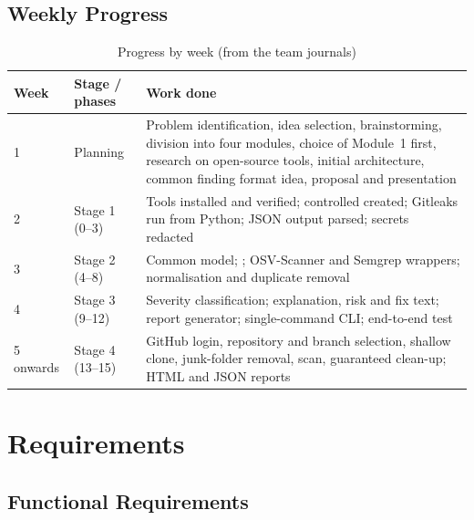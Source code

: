 \documentclass[12pt,a4paper]{article}
\newcommand{\code}[1]{\texttt{\detokenize{#1}}}
\begin{document}
\subsection{Weekly Progress}

\begin{table}[H]
\centering
\caption{Progress by week (from the team journals)}
\label{tab:weekly}
\begin{tabularx}{\textwidth}{@{}p{1.6cm}p{3.2cm}X@{}}
\toprule
\textbf{Week} & \textbf{Stage / phases} & \textbf{Work done} \\
\midrule
1 & Planning & Problem identification, idea selection, brainstorming, division into four modules, choice of Module~1 first, research on open-source tools, initial architecture, common finding format idea, proposal and presentation \\
2 & Stage 1 (0--3) & Tools installed and verified; controlled \code{test-repo} created; Gitleaks run from Python; JSON output parsed; secrets redacted \\
3 & Stage 2 (4--8) & Common \code{Finding} model; \code{SecurityEngine}; OSV-Scanner and Semgrep wrappers; normalisation and duplicate removal \\
4 & Stage 3 (9--12) & Severity classification; explanation, risk and fix text; report generator; single-command CLI; end-to-end test \\
5 onwards & Stage 4 (13--15) & GitHub login, repository and branch selection, shallow clone, junk-folder removal, scan, guaranteed clean-up; HTML and JSON reports \\
\bottomrule
\end{tabularx}
\end{table}

\section{Requirements}

\subsection{Functional Requirements}
\end{document}
